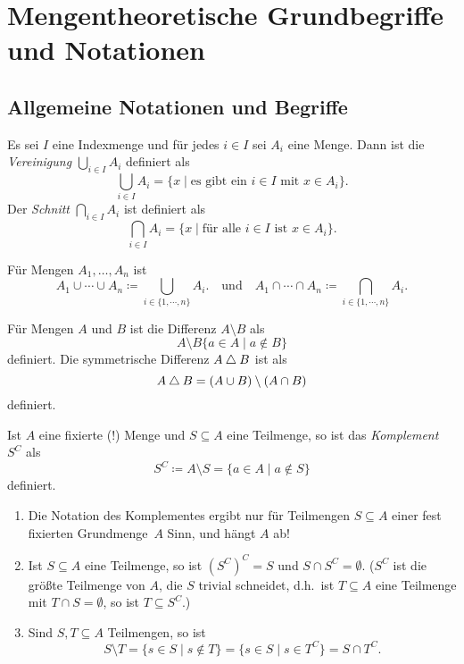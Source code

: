 \section{Mengentheoretische Grundbegriffe und Notationen}



\subsection{Allgemeine Notationen und Begriffe}


\begin{defi}
 Es sei $I$ eine Indexmenge und für jedes $i \in I$ sei $A_i$ eine Menge. Dann ist die \emph{Vereinigung} $\bigcup_{i \in I} A_i$ definiert als
 \[
  \bigcup_{i \in I} A_i
  = \{x \mid \text{es gibt ein $i \in I$ mit $x \in A_i$}\}.
 \]
 Der \emph{Schnitt} $\bigcap_{i \in I} A_i$ ist definiert als
 \[
  \bigcap_{i \in I} A_i
  = \{x \mid \text{für alle $i \in I$ ist $x \in A_i$}\}.
 \]
 
 Für Mengen $A_1, \dotsc, A_n$ ist
 \[
  A_1 \cup \dotsb \cup A_n \coloneqq \bigcup_{i \in \{1, \dotsb, n\}} A_i.
  \quad\text{und}\quad
  A_1 \cap \dotsb \cap A_n \coloneqq \bigcap_{i \in \{1, \dotsb, n\}} A_i.
 \]
\end{defi}


\begin{defi}
 Für Mengen $A$ und $B$ ist die Differenz $A \setminus B$ als
 \[
  A \setminus B \{a \in A \mid a \notin B\}
 \]
 definiert. Die symmetrische Differenz $A \bigtriangleup B$ ist als
 \[
  A \bigtriangleup B = (A \cup B) \setminus (A \cap B)
 \]
 definiert.
\end{defi}


\begin{defi}
 Ist $A$ eine fixierte (!) Menge und $S \subseteq A$ eine Teilmenge, so ist das \emph{Komplement} $S^C$ als
 \[
  S^C
  \coloneqq A \setminus S
  = \{a \in A \mid a \notin S\}
 \]
 definiert.
\end{defi}


\begin{bem}
 \begin{enumerate}[leftmargin=*]
  \item
   Die Notation des Komplementes ergibt nur für Teilmengen $S \subseteq A$ einer fest fixierten Grundmenge  $A$ Sinn, und hängt $A$ ab!
  \item
   Ist $S \subseteq A$ eine Teilmenge, so ist $(S^C)^C = S$ und $S \cap S^C = \emptyset$. ($S^C$ ist die größte Teilmenge von $A$, die $S$ trivial schneidet, d.h.\ ist $T \subseteq A$ eine Teilmenge mit $T \cap S = \emptyset$, so ist $T \subseteq S^C$.)
  \item
   Sind $S, T \subseteq A$ Teilmengen, so ist
   \[
    S \setminus T
    = \{s \in S \mid s \notin T\}
    = \{s \in S \mid s \in T^C\}
    = S \cap T^C.
   \]
 \end{enumerate}
\end{bem}


